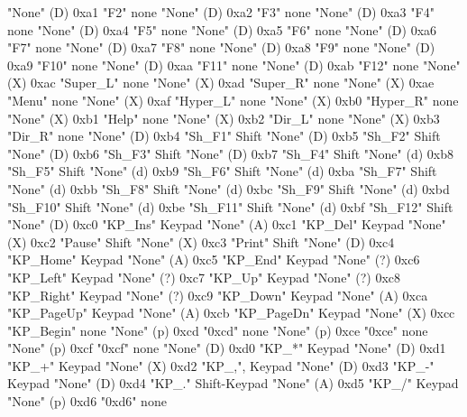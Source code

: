 "None"        (D)    0xa1    "F2"          none
"None"        (D)    0xa2    "F3"          none
"None"        (D)    0xa3    "F4"          none
"None"        (D)    0xa4    "F5"          none
"None"        (D)    0xa5    "F6"          none
"None"        (D)    0xa6    "F7"          none
"None"        (D)    0xa7    "F8"          none
"None"        (D)    0xa8    "F9"          none
"None"        (D)    0xa9    "F10"         none
"None"        (D)    0xaa    "F11"         none
"None"        (D)    0xab    "F12"         none
"None"        (X)    0xac    "Super_L"     none
"None"        (X)    0xad    "Super_R"     none
"None"        (X)    0xae    "Menu"        none
"None"        (X)    0xaf    "Hyper_L"     none
"None"        (X)    0xb0    "Hyper_R"     none
"None"        (X)    0xb1    "Help"        none
"None"        (X)    0xb2    "Dir_L"       none
"None"        (X)    0xb3    "Dir_R"       none
"None"        (D)    0xb4    "Sh_F1"       Shift
"None"        (D)    0xb5    "Sh_F2"       Shift
"None"        (D)    0xb6    "Sh_F3"       Shift
"None"        (D)    0xb7    "Sh_F4"       Shift
"None"        (d)    0xb8    "Sh_F5"       Shift
"None"        (d)    0xb9    "Sh_F6"       Shift
"None"        (d)    0xba    "Sh_F7"       Shift
"None"        (d)    0xbb    "Sh_F8"       Shift
"None"        (d)    0xbc    "Sh_F9"       Shift
"None"        (d)    0xbd    "Sh_F10"      Shift
"None"        (d)    0xbe    "Sh_F11"      Shift
"None"        (d)    0xbf    "Sh_F12"      Shift
"None"        (D)    0xc0    "KP_Ins"      Keypad
"None"        (A)    0xc1    "KP_Del"      Keypad
"None"        (X)    0xc2    "Pause"       Shift
"None"        (X)    0xc3    "Print"       Shift
"None"        (D)    0xc4    "KP_Home"     Keypad
"None"        (A)    0xc5    "KP_End"      Keypad
"None"        (?)    0xc6    "KP_Left"     Keypad
"None"        (?)    0xc7    "KP_Up"       Keypad
"None"        (?)    0xc8    "KP_Right"    Keypad
"None"        (?)    0xc9    "KP_Down"     Keypad
"None"        (A)    0xca    "KP_PageUp"   Keypad
"None"        (A)    0xcb    "KP_PageDn"   Keypad
"None"        (X)    0xcc    "KP_Begin"    none
"None"        (p)    0xcd    "0xcd"        none
"None"        (p)    0xce    "0xce"        none
"None"        (p)    0xcf    "0xcf"        none
"None"        (D)    0xd0    "KP_*"        Keypad
"None"        (D)    0xd1    "KP_+"        Keypad
"None"        (X)    0xd2    "KP_,",       Keypad
"None"        (D)    0xd3    "KP_-"        Keypad
"None"        (D)    0xd4    "KP_."        Shift-Keypad
"None"        (A)    0xd5    "KP_/"        Keypad
"None"        (p)    0xd6    "0xd6"        none
